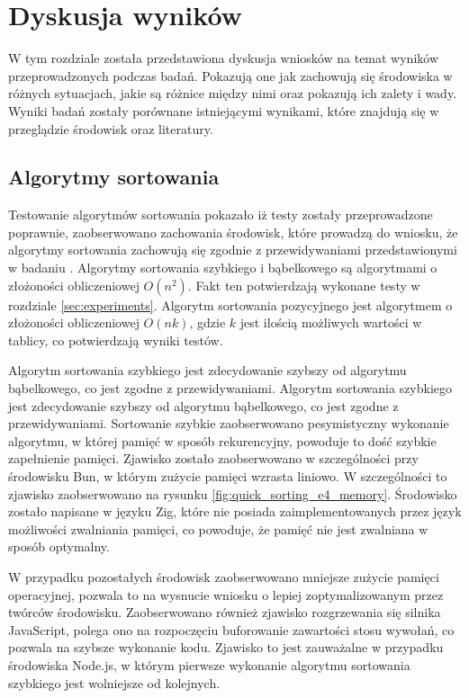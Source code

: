 \section{Dyskusja wyników}
W tym rozdziale została przedstawiona dyskusja wniosków na temat wyników przeprowadzonych podczas badań. Pokazują one jak zachowują się środowiska w różnych sytuacjach, jakie są różnice między nimi oraz pokazują ich zalety i wady. Wyniki badań zostały porównane istniejącymi wynikami, które znajdują się w przeglądzie środowisk oraz literatury.

\subsection{Algorytmy sortowania}
Testowanie algorytmów sortowania pokazało iż testy zostały przeprowadzone poprawnie, zaobserwowano zachowania środowisk, które prowadzą do wniosku, że algorytmy sortowania zachowują się zgodnie z przewidywaniami przedstawionymi w badaniu \cite{sorting}. Algorytmy sortowania szybkiego i bąbelkowego są algorytmami o złożoności obliczeniowej $O(n^2)$. Fakt ten potwierdzają wykonane testy w rozdziale \ref{sec:experiments}. Algorytm sortowania pozycyjnego jest algorytmem o złożoności obliczeniowej $O(nk)$, gdzie $k$ jest ilością możliwych wartości w tablicy, co potwierdzają wyniki testów.

Algorytm sortowania szybkiego jest zdecydowanie szybszy od algorytmu bąbelkowego, co jest zgodne z przewidywaniami. Algorytm sortowania szybkiego jest zdecydowanie szybszy od algorytmu bąbelkowego, co jest zgodne z przewidywaniami. Sortowanie szybkie zaobserwowano pesymistyczny wykonanie algorytmu, w której pamięć w sposób rekurencyjny, powoduje to dość szybkie zapełnienie pamięci. Zjawisko zostało zaobserwowano w szczególności przy środowisku Bun, w którym zużycie pamięci wzrasta liniowo. W szczególności to zjawisko zaobserwowano na rysunku \ref{fig:quick_sorting_e4_memory}. Środowisko zostało napisane w języku Zig, które nie posiada zaimplementowanych przez język możliwości zwalniania pamięci, co powoduje, że pamięć nie jest zwalniana w sposób optymalny. 

W przypadku pozostałych środowisk zaobserwowano mniejsze zużycie pamięci operacyjnej, pozwala to na wysnucie wniosku o lepiej zoptymalizowanym przez twórców środowisku. Zaobserwowano również zjawisko rozgrzewania się silnika JavaScript, polega ono na rozpoczęciu buforowanie zawartości stosu wywołań, co pozwala na szybsze wykonanie kodu. Zjawisko to jest zauważalne w przypadku środowiska Node.js, w którym pierwsze wykonanie algorytmu sortowania szybkiego jest wolniejsze od kolejnych.

